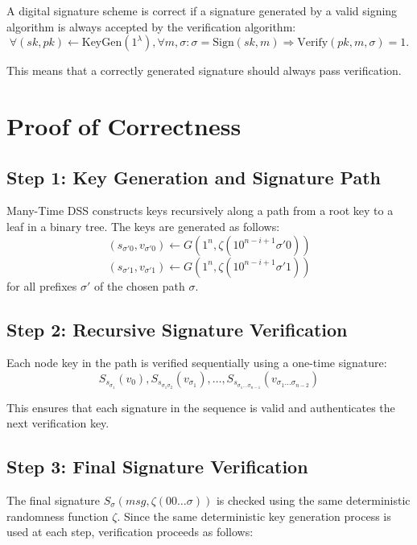 A digital signature scheme is correct if a signature generated by a valid signing algorithm is always accepted by the verification algorithm:
\begin{equation}
    \forall (sk, pk) \leftarrow \text{KeyGen}(1^\lambda), \forall m, \sigma: \sigma = \text{Sign}(sk, m) \Rightarrow \text{Verify}(pk, m, \sigma) = 1.
\end{equation}

This means that a correctly generated signature should always pass verification.

\section{Proof of Correctness}

\subsection{Step 1: Key Generation and Signature Path}
Many-Time DSS constructs keys recursively along a path from a root key to a leaf in a binary tree. The keys are generated as follows:
\begin{equation}
    (s_{\sigma'0}, v_{\sigma'0}) \gets G(1^n, \zeta(10^{n-i+1} \sigma'0))
\end{equation}
\begin{equation}
    (s_{\sigma'1}, v_{\sigma'1}) \gets G(1^n, \zeta(10^{n-i+1} \sigma'1))
\end{equation}
for all prefixes \( \sigma' \) of the chosen path \( \sigma \).

\subsection{Step 2: Recursive Signature Verification}
Each node key in the path is verified sequentially using a one-time signature:
\begin{equation}
    S_{s_{\sigma_1}} (v_0), S_{s_{\sigma_1 \sigma_2}} (v_{\sigma_1}), \dots, S_{s_{\sigma_1 \dots \sigma_{n-1}}} (v_{\sigma_1 \dots \sigma_{n-2}})
\end{equation}

This ensures that each signature in the sequence is valid and authenticates the next verification key.

\subsection{Step 3: Final Signature Verification}
The final signature \( S_{\sigma}(msg, \zeta(00\dots\sigma)) \) is checked using the same deterministic randomness function \( \zeta \). Since the same deterministic key generation process is used at each step, verification proceeds as follows:

